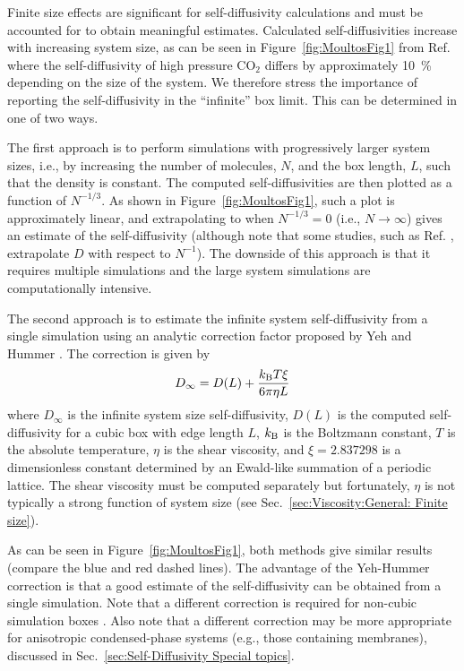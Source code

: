\documentclass[9pt,bestpractices]{livecoms}
\begin{document}
Finite size effects are significant for self-diffusivity calculations and must be accounted for to obtain meaningful estimates. Calculated self-diffusivities increase with increasing system size, as can be seen in Figure~\ref{fig:MoultosFig1} from Ref. \cite{Moultos2016} where the self-diffusivity of high pressure CO$_2$ differs by approximately 10~\% depending on the size of the system. We therefore stress the importance of reporting the self-diffusivity in the ``infinite'' box limit. This can be determined in one of two ways. 

The first approach is to perform simulations with progressively larger system sizes, i.e., by increasing the number of molecules, $N$, and the box length, $L$, such that the density is constant. The computed self-diffusivities are then plotted as a function of $N^{-1/3}$. As shown in Figure~\ref{fig:MoultosFig1}, such a plot is approximately linear, and extrapolating to when $N^{-1/3}=0$ (i.e., $N \rightarrow \infty$) gives an estimate of the self-diffusivity (although note that some studies, such as Ref. \cite{Daivis:1995}, extrapolate $D$ with respect to $N^{-1}$). The downside of this approach is that it requires multiple simulations and the large system simulations are computationally intensive. 

The second approach is to estimate the infinite system self-diffusivity from a single simulation using an analytic correction factor proposed by Yeh and Hummer \cite{Yeh2004}. The correction is given by
\begin{equation}
	D_{\infty} = D(L) + \frac{k_{\rm B} T \xi}{6 \pi \eta L}
	\label{eq:YH-correction}
\end{equation}
where $D_\infty$ is the infinite system size self-diffusivity, $D(L)$ is the computed self-diffusivity for a cubic box with edge length $L$, $k_{\rm B}$ is the Boltzmann constant,
$T$ is the absolute temperature, $\eta$ is the shear viscosity, and $\xi = 2.837298$ is a dimensionless constant determined by an Ewald-like summation of a periodic lattice. The shear viscosity must be computed separately but fortunately, $\eta$ is not typically a strong function of system size (see Sec.\ \ref{sec:Viscosity:General: Finite size}). 

As can be seen in Figure~\ref{fig:MoultosFig1}, both methods give similar results (compare the blue and red dashed lines). The advantage of the Yeh-Hummer correction is that a good estimate of the self-diffusivity can be obtained from a single simulation. Note that a different correction is required for non-cubic simulation boxes \cite{Kikugawa:2015}. Also note that a different correction may be more appropriate for anisotropic condensed-phase systems (e.g., those containing membranes), discussed in Sec.\ \ref{sec:Self-Diffusivity Special topics}.
\end{document}
